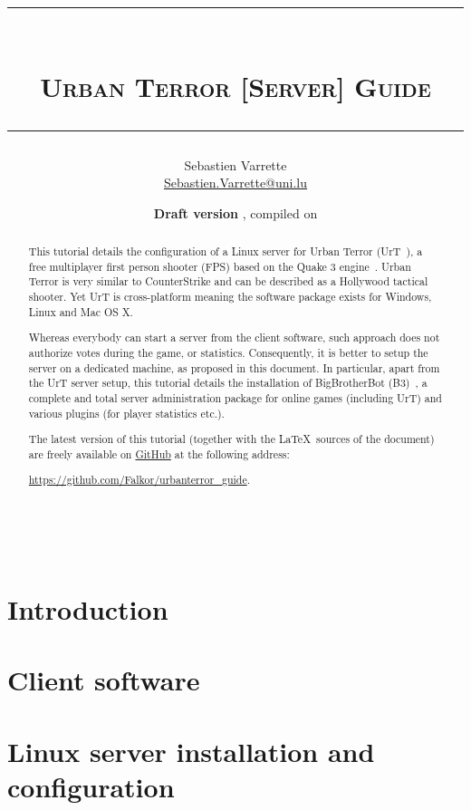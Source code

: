 \documentclass[11pt,twoside,a4paper]{article}
\title{
  {\rule{\textwidth}{1mm}}\\[1em]
  \textsc{Urban Terror [Server] Guide}\\[0.75em]
  {\rule{\textwidth}{1mm}}  
}
\author{Sebastien Varrette\\ {\small \url{Sebastien.Varrette@uni.lu}}}
\date{\textbf{Draft version \docversion}, compiled on \isodayandtime}
\begin{document}
\maketitle

\begin{abstract}
  This tutorial details the configuration of a Linux server for Urban Terror
  (UrT~\cite{urt}), a free multiplayer first person shooter (FPS) based on the
  Quake 3 engine~\cite{ioq3}.  Urban Terror is very similar to CounterStrike and
  can be described as a Hollywood tactical shooter. Yet UrT is cross-platform
  meaning the software package exists for Windows, Linux and Mac OS X.

  Whereas everybody can start a server from the client software, such approach
  does not authorize votes during the game, or statistics.  Consequently, it is
  better to setup the server on a dedicated machine, as proposed in this document.
  In particular, apart from the UrT server setup, this tutorial details the
  installation of BigBrotherBot (B3)~\cite{b3}, a complete and total server
  administration package for online games (including UrT) and various plugins (for
  player statistics etc.).

  The latest version of this tutorial (together with the \LaTeX\ sources of the
  document) are freely available on
  \href{https://github.com/Falkor/urbanterror_guide}{GitHub} at the following
  address:
  \begin{center}
       \url{https://github.com/Falkor/urbanterror_guide}.
  \end{center}
\end{abstract}

\clearpage
~\vfill

\clearpage

\tableofcontents
\clearpage


\section{Introduction}
\label{sec:intro}



\section{Client software}
\label{sec:urt_client}



\section{Linux server installation and configuration}
\label{sec:urt_server}

\end{document}

